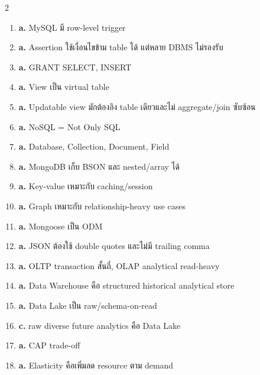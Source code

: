 \documentclass[a4paper,12pt]{article}
\newcommand{\ans}[1]{\textbf{#1}}
\begin{document}
\begin{multicols}{2}
\begin{enumerate}[label=\textbf{\arabic*.}]
    \item \ans{a.} MySQL มี row-level trigger
    \item \ans{a.} Assertion ใช้เงื่อนไขข้าม table ได้ แต่หลาย DBMS ไม่รองรับ
    \item \ans{a.} GRANT SELECT, INSERT
    \item \ans{a.} View เป็น virtual table
    \item \ans{a.} Updatable view มักต้องอิง table เดียวและไม่ aggregate/join ซับซ้อน
    \item \ans{a.} NoSQL = Not Only SQL
    \item \ans{a.} Database, Collection, Document, Field
    \item \ans{a.} MongoDB เก็บ BSON และ nested/array ได้
    \item \ans{a.} Key-value เหมาะกับ caching/session
    \item \ans{a.} Graph เหมาะกับ relationship-heavy use cases
    \item \ans{a.} Mongoose เป็น ODM
    \item \ans{a.} JSON ต้องใช้ double quotes และไม่มี trailing comma
    \item \ans{a.} OLTP transaction สั้นถี่, OLAP analytical read-heavy
    \item \ans{a.} Data Warehouse คือ structured historical analytical store
    \item \ans{a.} Data Lake เป็น raw/schema-on-read
    \item \ans{c.} raw diverse future analytics คือ Data Lake
    \item \ans{a.} CAP trade-off
    \item \ans{a.} Elasticity คือเพิ่มลด resource ตาม demand
\end{enumerate}
\end{multicols}
\end{document}
